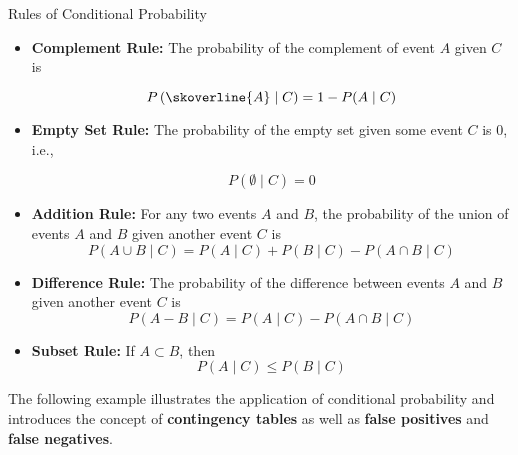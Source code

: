 \begin{theorem}{Rules of Conditional Probability}
    \begin{itemize}
        \item \textbf{Complement Rule:} The probability of the complement of event $A$ given $C$ is
    
        \[
        P\left(\skoverline{A} \mid C\right)=1-P(A \mid C)
        \]

        \item \textbf{Empty Set Rule:} The probability of the empty set given some event $C$ is 0, i.e.,
        
        \[P(\emptyset \mid C) = 0\]
        
        \item \textbf{Addition Rule:} For any two events $A$ and $B$, the probability of the union of events $A$ and $B$ given another event $C$ is
        \[
        P(A \cup B \mid C)=P(A \mid C)+P(B \mid C)-P(A \cap B \mid C)
        \]

        \item \textbf{Difference Rule:} The probability of the difference between events $A$ and $B$ given another event $C$ is
        \[
            P(A-B \mid C)=P(A \mid C)-P(A \cap B \mid C)
        \]
        \item \textbf{Subset Rule:} If $A \subset B$, then
        \[
        P(A \mid C) \leq P(B \mid C)
        \]
    \end{itemize}
\end{theorem}

The following example illustrates the application of conditional probability and introduces the concept of \textbf{contingency tables} as well as \textbf{false positives} and \textbf{false negatives}.

